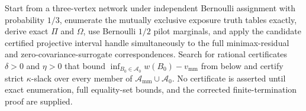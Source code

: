 Start from a three-vertex network under independent Bernoulli assignment with probability \(1/3\), enumerate the mutually exclusive exposure truth tables exactly, derive exact \(\Pi\) and \(\Omega\), use Bernoulli \(1/2\) pilot marginals, and apply the candidate certified projective interval handle simultaneously to the full minimax-residual and zero-covariance-surrogate correspondences.  Search for rational certificates \(\delta>0\) and \(\eta>0\) that bound \(\inf_{B_0\in\mathcal A_0}w(B_0)-v_{\mathrm{mm}}\) from below and certify strict \(\kappa\)-slack over every member of \(\mathcal A_{\mathrm{mm}}\cup\mathcal A_0\).  No certificate is asserted until exact enumeration, full equality-set bounds, and the corrected finite-termination proof are supplied.